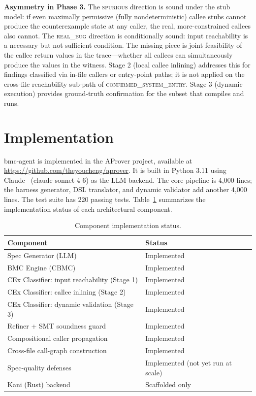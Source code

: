 \documentclass[11pt,a4paper]{article}
\newcommand{\tool}{bmc-agent\xspace}
\newcommand{\sysconf}{\textsc{confirmed\_system\_entry}\xspace}
\begin{document}
\smallskip\noindent\textbf{Asymmetry in Phase 3.}
The \textsc{spurious} direction is sound under the stub model: if even
maximally permissive (fully nondeterministic) callee stubs cannot produce the
counterexample state at any caller, the real, more-constrained callees also
cannot. The \textsc{real\_bug} direction is conditionally sound: input
reachability is a necessary but not sufficient condition. The missing piece
is joint feasibility of the callee return values in the trace---whether all
callees can simultaneously produce the values in the witness. Stage 2 (local callee inlining) addresses this for findings classified via
in-file callers or entry-point paths; it is not applied on the cross-file
reachability sub-path of \sysconf{}. Stage 3 (dynamic execution) provides
ground-truth confirmation for the subset that compiles and runs.

\section{Implementation}
\label{sec:impl}

\tool is implemented in the AProver project, available at
\url{https://github.com/theyoucheng/aprover}. It is built in Python 3.11
using Claude~\cite{anthropic-claude} (claude-sonnet-4-6) as the LLM backend. The core pipeline is 4{,}000 lines; the harness generator,
DSL translator, and dynamic validator add another 4{,}000 lines. The test
suite has 220 passing tests. Table~\ref{tab:components}
summarizes the implementation status of each architectural component.

\begin{table}[t]
\caption{Component implementation status.}
\label{tab:components}
\small
\begin{tabular}{ll}
\toprule
\textbf{Component} & \textbf{Status} \\
\midrule
Spec Generator (LLM)              & Implemented \\
BMC Engine (CBMC)                 & Implemented \\
CEx Classifier: input reachability (Stage 1) & Implemented \\
CEx Classifier: callee inlining (Stage 2)    & Implemented \\
CEx Classifier: dynamic validation (Stage 3) & Implemented \\
Refiner + SMT soundness guard     & Implemented \\
Compositional caller propagation  & Implemented \\
Cross-file call-graph construction& Implemented \\
Spec-quality defenses             & Implemented (not yet run at scale) \\
Kani (Rust) backend               & Scaffolded only \\
\bottomrule
\end{tabular}
\end{table}
\end{document}
